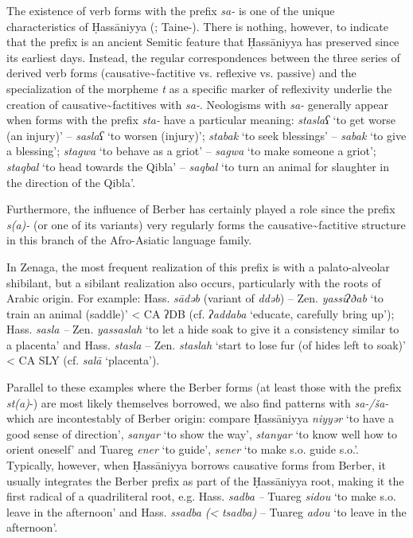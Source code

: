 \documentclass[output=paper]{langsci/langscibook}
\begin{document}

The existence of verb forms with the prefix \textit{sa-} is one of the unique characteristics of Ḥassāniyya (\citealt{Cohen1963}; Taine-\citealt{Cheikh2003}). There is nothing, however, to indicate that the prefix is an ancient Semitic feature that Ḥassāniyya has preserved since its earliest days. Instead, the regular correspondences between the three series of derived verb forms (causative{\textasciitilde}factitive vs. reflexive vs. passive) and the specialization of the morpheme \textit{t} as a specific marker of reflexivity underlie the creation of causative{\textasciitilde}factitives with \textit{sa-}. Neologisms with \textit{sa-} generally appear when forms with the prefix \textit{sta-} have a particular meaning: \textit{staslaʕ} ‘to get worse (an injury)’ – \textit{saslaʕ} ‘to worsen (injury)’; \textit{stab{\R}ak} ‘to seek blessings’ – \textit{sab{\R}ak} ‘to give a blessing’; \textit{stagwa} ‘to behave as a griot’ – \textit{sagwa} ‘to make someone a griot’; \textit{staqbal} ‘to head towards the Qibla’ – \textit{saqbal} ‘to turn an animal for slaughter in the direction of the Qibla’. 

Furthermore, the influence of Berber has certainly played a role since the prefix \textit{s(a)-} (or one of its variants) very regularly forms the causative{\textasciitilde}factitive structure in this branch of the Afro-Asiatic language family. 

In Zenaga, the most frequent realization of this prefix is with a palato-alveolar shibilant, but a sibilant realization also occurs, particularly with the roots of Arabic origin. For example: Hass. \textit{sādəb} (variant of \textit{ddəb}) – Zen. \textit{yassiʔðab} ‘to train an animal (saddle)’ < CA ʔDB (cf. \textit{ʔaddaba} ‘educate, carefully bring up’); Hass. \textit{sasla} \textit{–} Zen. \textit{yassaslah} ‘to let a hide soak to give it a consistency similar to a placenta’ and Hass. \textit{stasla} – Zen. \textit{staslah} ‘start to lose fur (of hides left to soak)’ < CA SLY (cf. \textit{salā} ‘placenta’).

Parallel to these examples where the Berber forms (at least those with the prefix \textit{st(a)}{}-) are most likely themselves borrowed, we also find patterns with \textit{sa-/ša-} which are incontestably of Berber origin: compare Ḥassāniyya \textit{niyyər} ‘to have a good sense of direction’, \textit{sanyar} ‘to show the way’, \textit{stanyar} ‘to know well how to orient oneself’ and Tuareg \textit{ener} ‘to guide’, \textit{sener} ‘to make s.o. guide s.o.’. Typically, however, when Ḥassāniyya borrows causative forms from Berber, it usually integrates the Berber prefix as part of the Ḥassāniyya root, making it the first radical of a quadriliteral root, e.g. Hass. \textit{sadba} \textit{–} Tuareg \textit{sidou} ‘to make s.o. leave in the afternoon’ and Hass. \textit{ssadba} \textit{(<} \textit{tsadba)} – Tuareg \textit{adou} ‘to leave in the afternoon’. 
\end{document}
